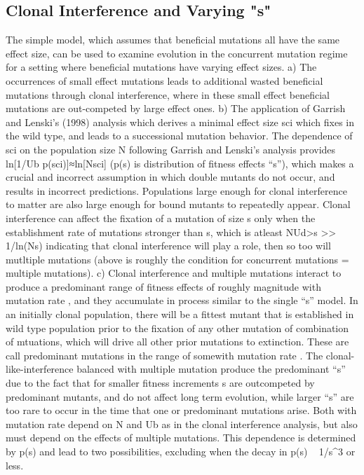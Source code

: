 \documentclass[12pt]{article}
\begin{document}
\subsection*{Clonal Interference and Varying "s"}
The simple model, which assumes that beneficial mutations all have the same effect size, can be used to examine evolution in the concurrent mutation regime for a setting where beneficial mutations have varying effect sizes.
 a) The occurrences of small effect mutations leads to additional wasted beneficial mutations through clonal interference, where in these small effect beneficial mutations are out-competed by large effect ones.  
 b) The application of Garrish and Lenski's (1998) analysis which derives a minimal effect size sci which fixes in the wild type, and leads to a successional mutation behavior.
The dependence of sci on the population size N following Garrish and Lenski's analysis provides ln[1/Ub p(sci)]≈ln[Nsci] (p(s) is distribution of fitness effects “s”), which makes a crucial and incorrect assumption in which double mutants do not occur, and results in incorrect predictions.
Populations large enough for clonal interference to matter are also large enough for bound mutants to repeatedly appear.  Clonal interference can affect the fixation of a mutation of size s only when the establishment rate of  mutations stronger than s, which is atleast NUd>s >> 1/ln(Ns) indicating that clonal interference will play a role, then so too will mutltiple mutations (above is roughly the condition for concurrent mutations = multiple mutations). 
 c) Clonal interference and multiple mutations interact to produce a predominant range of fitness effects of roughly magnitude with mutation rate , and they accumulate in process similar to the single “s” model.
In an initially clonal population, there will be a fittest mutant that is established in wild type population prior to the fixation of any other mutation of combination of mtuations, which will drive all other prior mutations to extinction.  These are call predominant mutations in the range of somewith mutation rate .
The clonal-like-interference balanced with multiple mutation produce the predominant “s” due to the fact that for smaller fitness increments s are outcompeted by predominant mutants, and do not affect long term evolution, while larger “s” are too rare to occur in the time that one or predominant mutations arise. 
Both  with mutation rate  depend on N and Ub as in the clonal interference analysis, but also must depend on the effects of multiple mutations.  This dependence is determined by p(s) and lead to two possibilities, excluding when the decay in p(s) ~ 1/s^3  or less.
\end{document}
